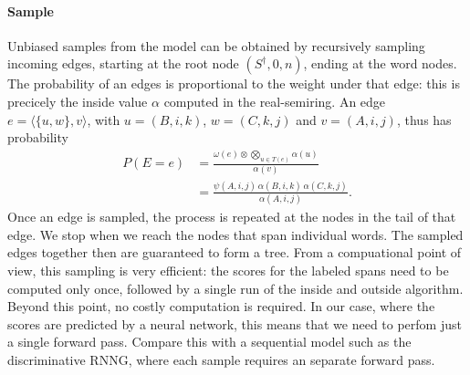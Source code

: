   \paragraph{Sample}
    Unbiased samples from the model can be obtained by recursively sampling incoming edges, starting at the root node $(S^{\dagger}, 0, n)$, ending at the word nodes. The probability of an edges is proportional to the weight under that edge: this is precicely the inside value $\alpha$ computed in the real-semiring. An edge $e = \langle \{ u, w \}, v \rangle$, with $u = (B, i, k)$, $w = (C, k, j)$ and $v = (A, i, j)$, thus has probability
    \begin{align}
      \label{eq:sample}
      P(E = e)
        &= \frac{\omega(e) \otimes \bigotimes_{u \in T(e)} \alpha(u)}{\alpha(v)}  \nonumber  \\
        &= \frac{\psi(A, i, j) \, \alpha(B, i, k) \, \alpha(C, k, j)}{\alpha(A, i, j)}.
    \end{align}
    Once an edge is sampled, the process is repeated at the nodes in the tail of that edge. We stop when we reach the nodes that span individual words. The sampled edges together then are guaranteed to form a tree. From a compuational point of view, this sampling is very efficient: the scores for the labeled spans need to be computed only once, followed by a single run of the inside and outside algorithm. Beyond this point, no costly computation is required. In our case, where the scores are predicted by a neural network, this means that we need to perfom just a single forward pass. Compare this with a sequential model such as the discriminative RNNG, where each sample requires an separate forward pass.

